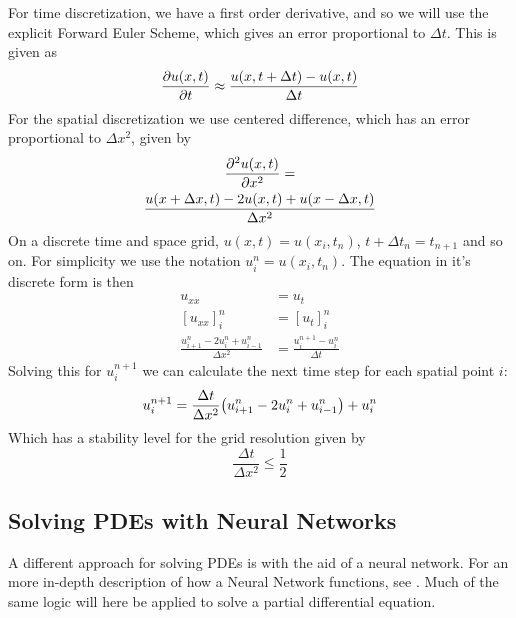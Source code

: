 For time discretization, we have a first order derivative, and so we will use the explicit Forward Euler Scheme, which gives an error proportional to $\Delta t$. This is given as
\begin{equation}
    \pdv{u(x,t)}{t} \approx \frac{u(x,t+\Delta t) - u(x,t)}{\Delta t}
    \label{eq:FE}
\end{equation}
For the spatial discretization we use centered difference, which has an error proportional to $\Delta x^2$, given by
\begin{multline}
    \pdv[2]{u(x,t)}{x} = \\ \frac{u(x+\Delta x,t) - 2u(x,t) + u(x-\Delta x,t)}{\Delta x^2}
    \label{eq:CD}
\end{multline}
On a discrete time and space grid, $u(x,t) = u(x_i,t_n)$, $t+\Delta t_n = t_{n+1}$ and so on.
For simplicity we use the notation $u_i^n = u(x_i,t_n)$. The equation in it's discrete form is then
\begin{equation}
\begin{split}
    u_{xx} &= u_t \\
    [u_{xx}]_i^n &= [u_t]_i^n \\
    \frac{u_{i+1}^n - 2u_i^n + u_{i-1}^n}{\Delta x^2} &= \frac{u_i^{n+1}-u_i^n}{\Delta t}
\end{split}
\end{equation}
Solving this for $u_i^{n+1}$ we can calculate the next time step for each spatial point $i$:
\begin{equation}
    u_i^{n+1} = \frac{\Delta t}{\Delta x^2}\qty(u_{i+1}^n - 2u_i^n + u_{i-1}^n)  + u_i^n
    \label{eq:theAlgorithm}
\end{equation}
Which has a stability level for the grid resolution given by
\begin{equation*}
    \frac{\Delta t}{\Delta x^2} \leq \frac{1}{2}
\end{equation*}

\subsection{Solving PDEs with Neural Networks}
A different approach for solving PDEs is with the aid of a neural network. For an more in-depth description of how a Neural Network functions, see \cite{prosjekt2}. Much of the same logic will here be applied to solve a partial differential equation.

